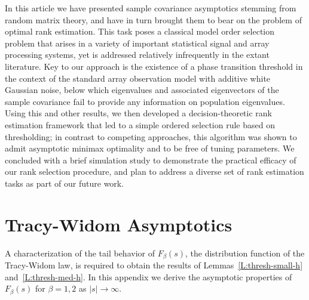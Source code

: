 \documentclass[final]{IEEEtran} %
\begin{document}
In this article we have presented sample covariance asymptotics stemming from random matrix theory, and have in turn brought them to bear on the problem of optimal rank estimation.  This task poses a classical model order selection problem that arises in a variety of important statistical signal and array processing systems, yet is addressed relatively infrequently in the extant literature.  Key to our approach is the existence of a phase transition threshold in the context of the standard array observation model with additive white Gaussian noise, below which eigenvalues and associated eigenvectors of the sample covariance fail to provide any information on population eigenvalues.  Using this and other results, we then developed a decision-theoretic rank estimation framework that led to a simple ordered selection rule based on thresholding; in contrast to competing approaches, this algorithm was shown to admit asymptotic minimax optimality and to be free of tuning parameters.  We concluded with a brief simulation study to demonstrate the practical efficacy of our rank selection procedure, and plan to address a diverse set of rank estimation tasks as part of our future work.

\appendices

\section{Tracy-Widom Asymptotics}\label{S:tw-asymp}

A characterization of the tail behavior of $F_\beta(s)$, the distribution function of the Tracy-Widom law, is required to obtain the results of Lemmas~\ref{L:thresh-small-h} and~\ref{L:thresh-med-h}.  In this appendix we derive the asymptotic properties of $F_\beta(s)$ for $\beta=1,2$ as
$|s| \to \infty$.
\end{document}
